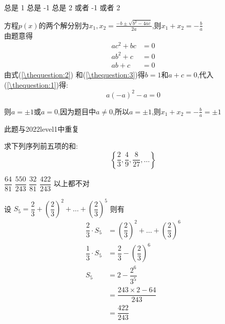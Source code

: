 \documentclass[answers]{exam}
\begin{document}
\begin{questions}
	\begin{oneparchoices}
		\choice 总是 1 \choice 总是 -1 \choice 总是 2  或者 -1  或者 2
	\end{oneparchoices}
	\begin{solution}
		方程$p(x)$的两个解分别为$\displaystyle x_1, x_2 = \frac{-b \pm \sqrt{b^2 - 4ac}}{2a}$,则$\displaystyle x_1 +
			x_2 = -\frac{b}{a}$\\
		由题意得
		\begin{align}
			ac^2  + bc & = 0 \label{\thequestion:1} \\
			ab^2  + c  & = 0 \label{\thequestion:2} \\
			ab    + c  & = 0 \label{\thequestion:3}
		\end{align}
		由式(\ref{\thequestion:2}) 和(\ref{\thequestion:3})得$b=1$和$a+c=0$,代入(\ref{\thequestion:1})得:
		\begin{equation}
			a(-a)^2 -a  = 0
		\end{equation}

		则$a=\pm 1$或$a=0$,因为题目中$a \ne 0$,所以$a=\pm 1$,则$\displaystyle x_1 + x_2 = -\frac{b}{a}=\pm 1$

		此题与2022level1中重复
	\end{solution}

	\question 求下列序列前五项的和:
	\begin{equation*}
		\left\{ \dfrac{2}{3}, \dfrac{4}{9}, \dfrac{8}{27}, \dots\right\}
	\end{equation*}

	\begin{oneparchoices}
		\choice \( \dfrac{64}{81} \)
		\choice \( \dfrac{550}{243} \)
		\choice \( \dfrac{32}{81} \)
		\CorrectChoice \( \dfrac{422}{243} \)
		\choice 以上都不对
	\end{oneparchoices}

	\begin{solution}
		设 \( S_5 = \dfrac{2}{3} + \left(\dfrac{2}{3}\right)^2 + \dots + \left(\dfrac{2}{3}\right)^5\)
		则有
		\begin{align*}
			\dfrac{2}{3}\cdot S_5 & = \left(\dfrac{2}{3}\right)^2 + \dots + \left(\dfrac{2}{3}\right)^6 \\
			\dfrac{1}{3}\cdot S_5 & = \dfrac{2}{3} - \left(\dfrac{2}{3}\right)^6                        \\
			S_5                   & = 2 - \dfrac{2^6}{3^5}                                              \\
			                      & = \dfrac{243 \times 2 - 64}{243}                                    \\
			                      & = \dfrac{422}{243}
		\end{align*}
	\end{solution}


\end{questions}
\end{document}

